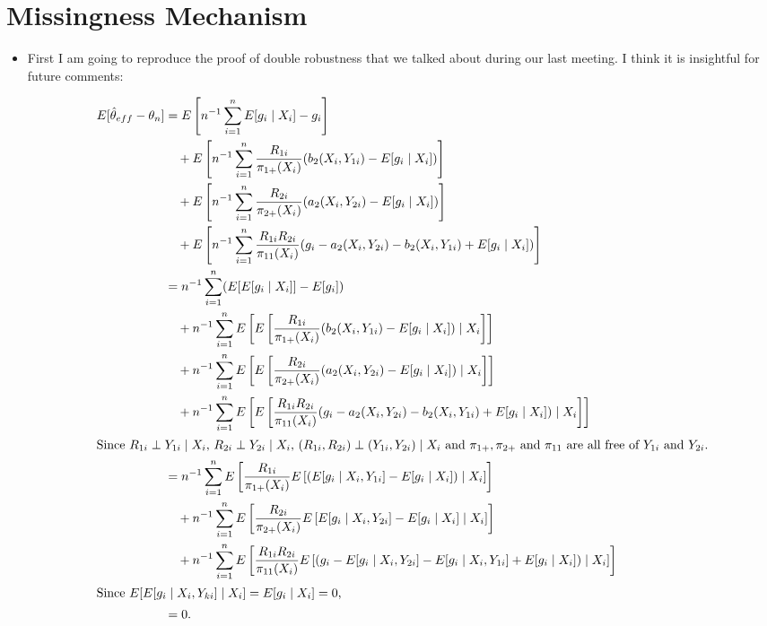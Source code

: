 
\section*{Missingness Mechanism}

\begin{itemize}
  \item First I am going to reproduce the proof of double robustness that we
    talked about during our last meeting. I think it is insightful for future
    comments:

    \begin{align*}
      E[\hat \theta_{eff} - \theta_n] 
      &= E\left[n^{-1} \sum_{i = 1}^n E[g_i \mid X_i] - g_i\right]\\
      &\quad+ E\left[n^{-1} \sum_{i = 1}^n \frac{R_{1i}}{\pi_{1+}(X_i)}
      (b_2(X_i, Y_{1i}) - E[g_i \mid X_i])\right]\\
      &\quad+ E\left[n^{-1} \sum_{i = 1}^n \frac{R_{2i}}{\pi_{2+}(X_i)}
      (a_2(X_i, Y_{2i}) - E[g_i \mid X_i])\right]\\
      &\quad+ E\left[n^{-1} \sum_{i = 1}^n \frac{R_{1i} R_{2i}}{\pi_{11}(X_i)} 
      (g_i - a_2(X_i, Y_{2i}) - b_2(X_i, Y_{1i}) + E[g_i \mid X_i])\right]\\
      &= n^{-1} \sum_{i = 1}^n (E[E[g_i \mid X_i]] - E[g_i])\\
      &\quad+ n^{-1} \sum_{i = 1}^n E\left[E\left[\frac{R_{1i}}{\pi_{1+}(X_i)} 
      (b_2(X_i, Y_{1i}) - E[g_i \mid X_i]) \mid X_i\right]\right] \\ 
      &\quad+ n^{-1} \sum_{i = 1}^n E\left[E\left[\frac{R_{2i}}{\pi_{2+}(X_i)} 
      (a_2(X_i, Y_{2i}) - E[g_i \mid X_i]) \mid X_i\right]\right] \\
      &\quad+ n^{-1} \sum_{i = 1}^n E\left[E\left[\frac{R_{1i}
      R_{2i}}{\pi_{11}(X_i)} (g_i - a_2(X_i, Y_{2i}) - b_2(X_i, Y_{1i}) + E[g_i
      \mid X_i]) \mid X_i \right]\right]\\
      \intertext{Since $R_{1i} \perp Y_{1i} \mid X_i$, $R_{2i} \perp Y_{2i} \mid
      X_i$, $(R_{1i}, R_{2i}) \perp (Y_{1i}, Y_{2i}) \mid X_i$ and $\pi_{1+},
      \pi_{2+}$ and $\pi_{11}$ are all free of $Y_{1i}$ and $Y_{2i}$.}
      &= n^{-1} \sum_{i = 1}^n E\left[\frac{R_{1i}}{\pi_{1+}(X_i)} E\left[
        (E[g_i \mid X_i, Y_{1i}] - E[g_i \mid X_i]) \mid X_i\right]\right] \\ 
      &\quad+ n^{-1} \sum_{i = 1}^n E\left[\frac{R_{2i}}{\pi_{2+}(X_i)} 
      E\left[E[g_i \mid X_i, Y_{2i}] - E[g_i \mid X_i] \mid X_i\right]\right] \\
      &\quad+ n^{-1} \sum_{i = 1}^n E\left[\frac{R_{1i}
      R_{2i}}{\pi_{11}(X_i)} E\left[(g_i - E[g_i \mid X_i, Y_{2i}] - 
      E[g_i \mid X_i, Y_{1i}]+ E[g_i \mid X_i]) \mid X_i \right]\right]\\
      \intertext{Since $E[E[g_i \mid X_i, Y_{ki}] \mid X_i] = E[g_i \mid X_i] =
      0$,}
      &= 0.
    \end{align*}


\end{itemize}
